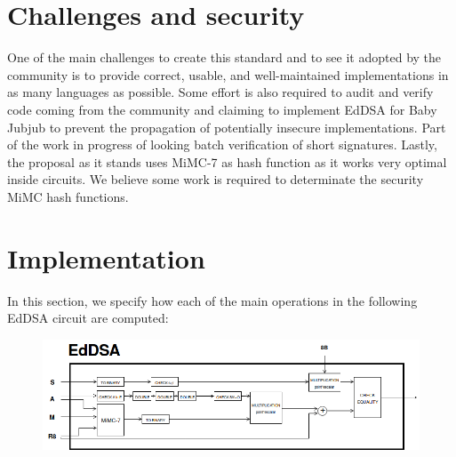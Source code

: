 \documentclass{article}
\begin{document}
\begin{spacing}{1.2}
	
\section{Challenges and security}
One of the main challenges to create this standard and to see it adopted by the community
is to provide correct, usable, and well-maintained implementations in as many languages as
possible. 
%
Some effort is also required to audit and verify code coming from the community and claiming
to implement EdDSA for Baby Jubjub to prevent the propagation of potentially
insecure implementations. Part of the work in progress of looking batch verification of short signatures. 
%
Lastly, the proposal as it stands uses MiMC-7 as hash function as it works very optimal inside circuits. We believe some work is required to determinate the security MiMC hash functions. 
%
%				 


	
\section{Implementation}			%
In this section, we specify how each of the main operations in the following EdDSA circuit are computed:
\begin{figure}[h]
	\centering
	\includegraphics[scale=0.4]{circuit-eddsa.png}
\end{figure}
%	


\end{spacing}
\end{document}
